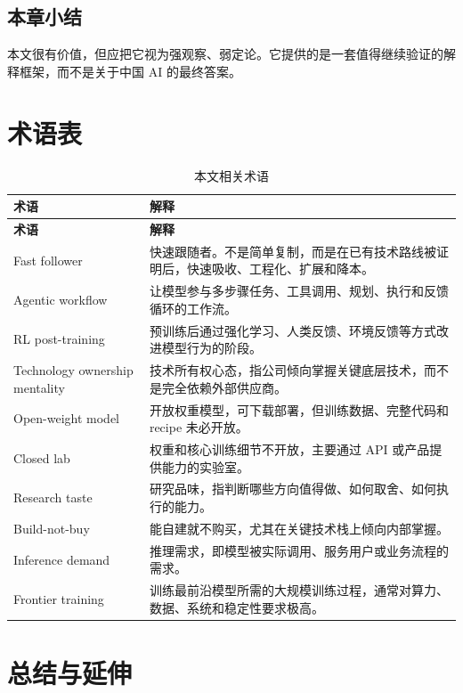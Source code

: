 \documentclass[a4paper]{article}
\begin{document}
\subsection{本章小结}

本文很有价值，但应把它视为强观察、弱定论。它提供的是一套值得继续验证的解释框架，而不是关于中国 AI 的最终答案。


\section{术语表}

\begin{longtable}{@{}p{3.4cm}p{10cm}@{}}
\caption{本文相关术语}\\
\toprule
\textbf{术语} & \textbf{解释} \\
\midrule
\endfirsthead
\toprule
\textbf{术语} & \textbf{解释} \\
\midrule
\endhead
Fast follower & 快速跟随者。不是简单复制，而是在已有技术路线被证明后，快速吸收、工程化、扩展和降本。 \\
\addlinespace
Agentic workflow & 让模型参与多步骤任务、工具调用、规划、执行和反馈循环的工作流。 \\
\addlinespace
RL post-training & 预训练后通过强化学习、人类反馈、环境反馈等方式改进模型行为的阶段。 \\
\addlinespace
Technology ownership mentality & 技术所有权心态，指公司倾向掌握关键底层技术，而不是完全依赖外部供应商。 \\
\addlinespace
Open-weight model & 开放权重模型，可下载部署，但训练数据、完整代码和 recipe 未必开放。 \\
\addlinespace
Closed lab & 权重和核心训练细节不开放，主要通过 API 或产品提供能力的实验室。 \\
\addlinespace
Research taste & 研究品味，指判断哪些方向值得做、如何取舍、如何执行的能力。 \\
\addlinespace
Build-not-buy & 能自建就不购买，尤其在关键技术栈上倾向内部掌握。 \\
\addlinespace
Inference demand & 推理需求，即模型被实际调用、服务用户或业务流程的需求。 \\
\addlinespace
Frontier training & 训练最前沿模型所需的大规模训练过程，通常对算力、数据、系统和稳定性要求极高。 \\
\bottomrule
\end{longtable}


\section{总结与延伸}
\end{document}
